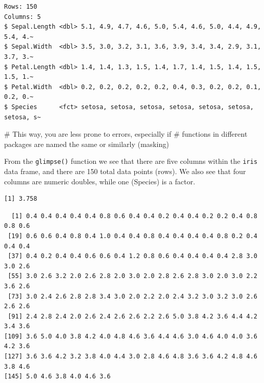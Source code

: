 \documentclass[
  letterpaper,
  DIV=11,
  numbers=noendperiod]{scrreprt}
\newenvironment{Shaded}{\begin{snugshade}}{\end{snugshade}}
\newcommand{\CommentTok}[1]{\textcolor[rgb]{0.37,0.37,0.37}{#1}}
\newcommand{\DecValTok}[1]{\textcolor[rgb]{0.68,0.00,0.00}{#1}}
\newcommand{\FunctionTok}[1]{\textcolor[rgb]{0.28,0.35,0.67}{#1}}
\newcommand{\NormalTok}[1]{\textcolor[rgb]{0.00,0.23,0.31}{#1}}
\newcommand{\SpecialCharTok}[1]{\textcolor[rgb]{0.37,0.37,0.37}{#1}}
\begin{document}
\begin{verbatim}
Rows: 150
Columns: 5
$ Sepal.Length <dbl> 5.1, 4.9, 4.7, 4.6, 5.0, 5.4, 4.6, 5.0, 4.4, 4.9, 5.4, 4.~
$ Sepal.Width  <dbl> 3.5, 3.0, 3.2, 3.1, 3.6, 3.9, 3.4, 3.4, 2.9, 3.1, 3.7, 3.~
$ Petal.Length <dbl> 1.4, 1.4, 1.3, 1.5, 1.4, 1.7, 1.4, 1.5, 1.4, 1.5, 1.5, 1.~
$ Petal.Width  <dbl> 0.2, 0.2, 0.2, 0.2, 0.2, 0.4, 0.3, 0.2, 0.2, 0.1, 0.2, 0.~
$ Species      <fct> setosa, setosa, setosa, setosa, setosa, setosa, setosa, s~
\end{verbatim}

\begin{Shaded}
\begin{Highlighting}[]
\CommentTok{\# This way, you are less prone to errors, especially if }
\CommentTok{\# functions in different packages are named the same or similarly (masking)}
\end{Highlighting}
\end{Shaded}

From the \texttt{glimpse()} function we see that there are five columns
within the \texttt{iris} data frame, and there are 150 total data points
(rows). We also see that four columns are numeric doubles, while one
(Species) is a factor.

\begin{Shaded}
\end{Shaded}

\begin{verbatim}
[1] 3.758
\end{verbatim}

\begin{Shaded}
\end{Shaded}

\begin{verbatim}
  [1] 0.4 0.4 0.4 0.4 0.4 0.8 0.6 0.4 0.4 0.2 0.4 0.4 0.2 0.2 0.4 0.8 0.8 0.6
 [19] 0.6 0.6 0.4 0.8 0.4 1.0 0.4 0.4 0.8 0.4 0.4 0.4 0.4 0.8 0.2 0.4 0.4 0.4
 [37] 0.4 0.2 0.4 0.4 0.6 0.6 0.4 1.2 0.8 0.6 0.4 0.4 0.4 0.4 2.8 3.0 3.0 2.6
 [55] 3.0 2.6 3.2 2.0 2.6 2.8 2.0 3.0 2.0 2.8 2.6 2.8 3.0 2.0 3.0 2.2 3.6 2.6
 [73] 3.0 2.4 2.6 2.8 2.8 3.4 3.0 2.0 2.2 2.0 2.4 3.2 3.0 3.2 3.0 2.6 2.6 2.6
 [91] 2.4 2.8 2.4 2.0 2.6 2.4 2.6 2.6 2.2 2.6 5.0 3.8 4.2 3.6 4.4 4.2 3.4 3.6
[109] 3.6 5.0 4.0 3.8 4.2 4.0 4.8 4.6 3.6 4.4 4.6 3.0 4.6 4.0 4.0 3.6 4.2 3.6
[127] 3.6 3.6 4.2 3.2 3.8 4.0 4.4 3.0 2.8 4.6 4.8 3.6 3.6 4.2 4.8 4.6 3.8 4.6
[145] 5.0 4.6 3.8 4.0 4.6 3.6
\end{verbatim}
\end{document}
